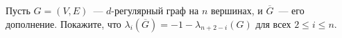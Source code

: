 Пусть $G = (V, E)$~--- $d$-регулярный граф на $n$ вершинах, и $\overline{G}$~--- его дополнение. Покажите, что
$\lambda_i(\overline{G}) = -1 - \lambda_{n + 2 - i}(G)$ для всех $2 \le i \le n$. 